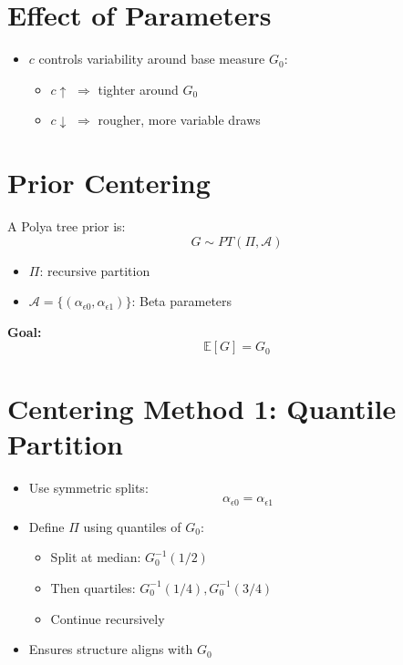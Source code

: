 \documentclass[12pt,oneside]{book}
\numberwithin{equation}{section}
\theoremstyle{definition}
\theoremstyle{plain}
\theoremstyle{remark}
\begin{document}
\section{Effect of Parameters}

\begin{itemize}
\item $c$ controls variability around base measure $G_0$:

\begin{itemize}
\item $c \uparrow$ $\Rightarrow$ tighter around $G_0$
\item $c \downarrow$ $\Rightarrow$ rougher, more variable draws
\end{itemize}
\end{itemize}

\section{Prior Centering}

A Polya tree prior is:
\[
G \sim PT(\Pi, \mathcal{A})
\]

\begin{itemize}
\item $\Pi$: recursive partition
\item $\mathcal{A} = \{(\alpha_{\epsilon 0}, \alpha_{\epsilon 1})\}$: Beta parameters
\end{itemize}

\textbf{Goal:}
\[
\mathbb{E}[G] = G_0
\]

\section{Centering Method 1: Quantile Partition}

\begin{itemize}
\item Use symmetric splits:
\[
\alpha_{\epsilon 0} = \alpha_{\epsilon 1}
\]

\item Define $\Pi$ using quantiles of $G_0$:

\begin{itemize}
\item Split at median: $G_0^{-1}(1/2)$
\item Then quartiles: $G_0^{-1}(1/4), G_0^{-1}(3/4)$
\item Continue recursively
\end{itemize}

\item Ensures structure aligns with $G_0$
\end{itemize}
\end{document}
